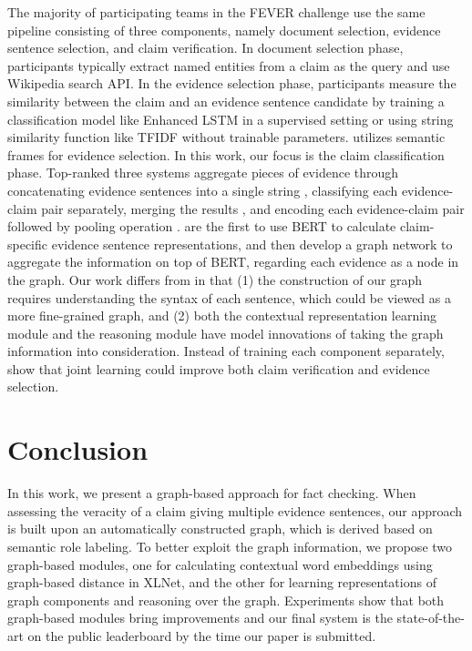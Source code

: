 \documentclass[11pt,a4paper]{article}
\begin{document}
The majority of participating teams in the FEVER challenge \cite{thorne2018fact} use the same pipeline consisting of three components, namely document selection, evidence sentence selection, and claim verification.
In document selection phase, participants typically extract named entities from a claim as the query and use Wikipedia search API.
In the evidence selection phase, participants measure the similarity between the claim and an evidence sentence candidate by training a classification model like Enhanced LSTM \cite{chen2016enhanced} in a supervised setting or using string similarity function like TFIDF without trainable parameters. \citet{padia-etal-2018-team} utilizes semantic frames for evidence selection.
In this work, our focus is the claim classification phase. 
Top-ranked three systems aggregate pieces of evidence through concatenating evidence sentences into a single string \cite{nie2019combining}, classifying each evidence-claim pair separately, merging the results \cite{yoneda2018ucl}, and encoding each evidence-claim pair followed by pooling operation \cite{hanselowski2018ukp}.
 are the first to use BERT to calculate claim-specific evidence sentence representations, and then develop a graph network to aggregate the information on top of BERT, regarding each evidence as a node in the graph. 
Our work differs from  in that (1) the construction of our graph requires understanding the syntax of each sentence, which could be viewed as a more fine-grained graph, and (2) both the contextual representation learning module and the reasoning module have model innovations of taking the graph information into consideration. 
Instead of training each component separately,  show that joint learning could improve both claim verification
and evidence selection.



\section{Conclusion}
In this work, we present a graph-based approach for fact checking.
When assessing the veracity of a claim giving multiple evidence sentences, 
our approach is built upon an automatically constructed graph, which is derived based on semantic role labeling. 
To better exploit the graph information, we propose two graph-based modules, one for calculating contextual word embeddings using graph-based distance in XLNet, and the other for learning representations of graph components and reasoning over the graph.
Experiments show that both graph-based modules bring improvements and our final system is the state-of-the-art on the public leaderboard by the time our paper is submitted.
\end{document}
